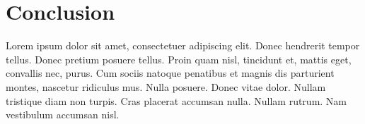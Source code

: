 \documentclass[a4paper,12pt]{article}
\begin{document}
\section{Conclusion}

Lorem ipsum dolor sit amet, consectetuer adipiscing elit.  Donec
hendrerit tempor tellus.  Donec pretium posuere tellus.  Proin quam
nisl, tincidunt et, mattis eget, convallis nec, purus.  Cum sociis
natoque penatibus et magnis dis parturient montes, nascetur ridiculus
mus.  Nulla posuere.  Donec vitae dolor.  Nullam tristique diam non
turpis.  Cras placerat accumsan nulla.  Nullam rutrum.  Nam vestibulum
accumsan nisl.

\nocite{*} %
\printbibliography
\end{document}
